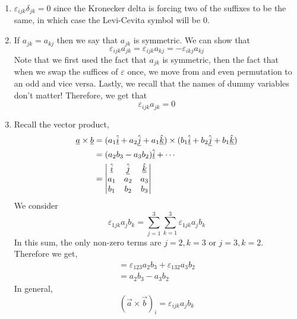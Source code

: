 \documentclass{article}
\numberwithin{equation}{section}
\begin{document}
\begin{remark}\leavevmode
    \begin{enumerate}
        \item $\varepsilon_{ijk}\delta_{jk} = 0$ since the Kronecker delta is forcing two of the suffixes to be the same, in which case the Levi-Cevita symbol will be $0$.
        \item If $a_{jk} = a_{kj}$ then we say that $a_{jk}$ is symmetric. We can show that
        \[
            \varepsilon_{ijk}a_{jk} = \varepsilon_{ijk}a_{kj} = - \varepsilon_{ikj}a_{kj}
        \]
        Note that we first used the fact that $a_{jk}$ is symmetric, then the fact that when we swap the suffices of $\varepsilon$ once, we move from and even permutation to an odd and vice versa. Lastly, we recall that the names of dummy variables don't matter! Therefore, we get that
        \[
            \varepsilon_{ijk}a_{jk} = 0
        \]
        \item Recall the vector product, 
        \begin{align*}
            \underline{a} \times \underline{b} &= (a_1\hat{\underline{i}} + a_2\hat{\underline{j}} + a_1\hat{\underline{k}}) \times (b_1\hat{\underline{i}} + b_2\hat{\underline{j}} + b_1\hat{\underline{k}}) \\
            &= (a_2b_3 - a_3b_2)\hat{\underline{i}} + \cdots \\
            &= \begin{vmatrix}
                \hat{\underline{i}} & \hat{\underline{j}} & \hat{\underline{k}} \\
                a_1 & a_2 & a_3 \\
                b_1 & b_2 & b_3
            \end{vmatrix}
        \end{align*}
        We consider
        \[
            \varepsilon_{1jk}a_jb_k = \sum_{j=1}^{3}\sum_{k=1}^{3} \varepsilon_{1jk}a_jb_k 
        \]
        In this sum, the only non-zero terms are $j=2, k=3$ or $j=3, k=2$. Therefore we get,
        \begin{align*}
            = \varepsilon_{123}a_2b_3 + \varepsilon_{132}a_3b_2 \\
            = a_2b_3 - a_3b_2
        \end{align*}
        In general,
        \begin{equation}
            (\vec{a} \times \vec{b})_i = \varepsilon_{ijk}a_jb_k
        \end{equation}
    \end{enumerate}
\end{remark}

\end{document}
